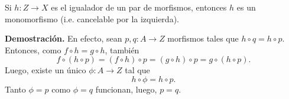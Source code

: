 \documentclass[10pt]{article}
\newtheorem[M]{teo}{Teorema}[section]
\newtheorem[M]{listaObj}[teo]{Lista de deseos}
\newtheorem[M]{preg}[teo]{Pregunta}
\newtheorem[M]{lema}[teo]{Lema}
\newtheorem[M]{hip}[teo]{Hipótesis}
\newtheorem[M]{prop}[teo]{Proposición}
\newtheorem[M]{obs}[teo]{Observación}
\newtheorem[M]{cor}[teo]{Corolario}
\newtheorem[M]{notacion}[teo]{Notación}
\newtheorem[M]{nota}[teo]{Nota}
\begin{document}
\begin{prop}
Si $h: Z \longrightarrow X$ es el igualador de un par de morfismos,
entonces $h$ es un monomorfismo (i.e. cancelable por la izquierda).
\end{prop}
\noindent
\textbf{Demostración.}
En efecto, sean $p, q: A \longrightarrow Z$ morfismos tales que 
$h \circ q = h \circ p$.
Entonces, como $f \circ h = g \circ h$, también
\[
f \circ (h \circ p) = (f \circ h) \circ p 
= (g \circ h) \circ p = g \circ (h \circ p).
\]
Luego, existe un único $\phi : A \longrightarrow Z$ tal que 
\[
h \circ \phi = h \circ p.
\]
Tanto $\phi = p$ como $\phi = q$ funcionan, luego, $p = q$.

\begin{center}
\begin{tikzpicture}[x=0.75pt,y=0.75pt,yscale=-1,xscale=1]



\end{tikzpicture}
\end{center}
\end{document}
